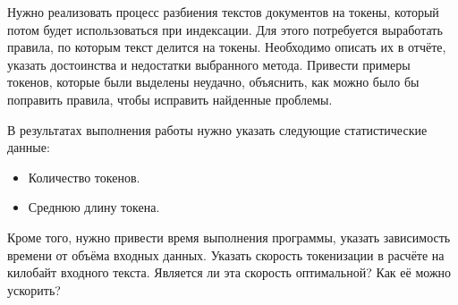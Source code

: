 \pagebreak
{}

Нужно реализовать процесс разбиения текстов документов на токены, который потом будет использоваться при индексации. Для этого потребуется выработать правила, по которым текст делится на токены. Необходимо описать их в отчёте, указать достоинства и недостатки выбранного метода. Привести примеры токенов, которые были выделены неудачно, объяснить, как можно было бы поправить правила, чтобы исправить найденные проблемы.

В результатах выполнения работы нужно указать следующие статистические данные:
\begin{itemize}
    \item Количество токенов.
    \item Среднюю длину токена.
\end{itemize}

Кроме того, нужно привести время выполнения программы, указать зависимость времени от объёма входных данных. Указать скорость токенизации в расчёте на килобайт входного текста. Является ли эта скорость оптимальной? Как её можно ускорить?
